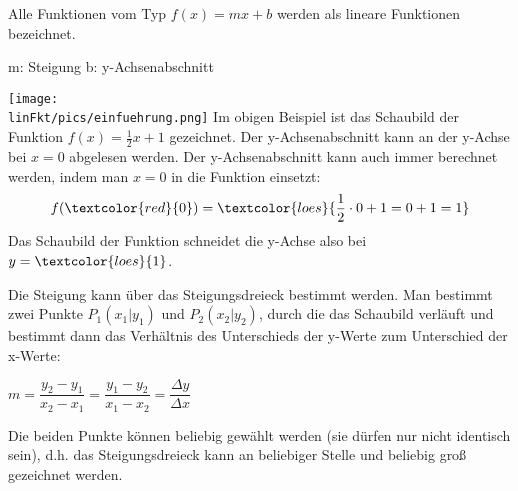 
Alle Funktionen vom Typ $f(x)=mx+b$ werden als lineare Funktionen bezeichnet.
\begin{tcolorbox}
	\centering\textcolor{loestc}{m: Steigung \qquad	b: y-Achsenabschnitt}
\end{tcolorbox}
\texttt{[image: \\linFkt/pics/einfuehrung.png]}
Im obigen Beispiel ist das Schaubild der Funktion $f(x)=\frac{1}{2}x+1$ gezeichnet. Der y-Achsenabschnitt kann an der y-Achse bei $x=0$ abgelesen werden. Der y-Achsenabschnitt kann auch immer berechnet werden, indem man $x=0$ in die Funktion einsetzt:
\begin{align*}
	f(\textcolor{red}{0})=\textcolor{loes}{\frac{1}{2}\cdot 0+1=0+1=1}
\end{align*}
Das Schaubild der Funktion schneidet die y-Achse also bei $y=\textcolor{loes}{1}$\textcolor{loes}{.}

Die Steigung kann über das Steigungsdreieck bestimmt werden. Man bestimmt zwei Punkte $P_1(x_1|y_1)$ und $P_2(x_2|y_2)$, durch die das Schaubild verläuft und bestimmt dann das Verhältnis des Unterschieds der y-Werte zum Unterschied der x-Werte:
\begin{tcolorbox}
	\centering\textcolor{loestc}{$m=\dfrac{y_2-y_1}{x_2-x_1}=\dfrac{y_1-y_2}{x_1-x_2}=\dfrac{\Delta y}{\Delta x}$}
\end{tcolorbox}
Die beiden Punkte können beliebig gewählt werden (sie dürfen nur nicht identisch sein), d.h. das Steigungsdreieck kann an beliebiger Stelle und beliebig groß gezeichnet werden.

